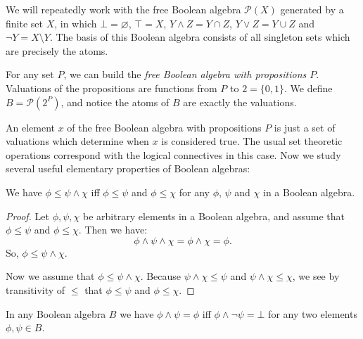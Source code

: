 We will repeatedly work with the free Boolean algebra $\mathcal{P}(X)$ generated by a finite set $X$, in which $\bot = \varnothing$, $\top = X$, $Y \land Z = Y \cap Z$, $Y \lor Z = Y \cup Z$ and $\neg Y = X \setminus Y$. The basis of this Boolean algebra consists of all singleton sets which are precisely the atoms.

\begin{example}
For any set $P$, we can build the \emph{free Boolean algebra with propositions $P$}. Valuations of the propositions are functions from $P$ to $2 = \{0 ,1\}$. We define $B = \mathcal{P}(2^P)$, and notice the atoms of $B$ are exactly the valuations.
\end{example}

An element $x$ of the free Boolean algebra with propositions $P$ is just a set of valuations which determine when $x$ is considered true. The usual set theoretic operations correspond with the logical connectives in this case. Now we study several useful elementary properties of Boolean algebras:

\begin{lem}
\label{and}
We have $\phi \leq \psi \wedge \chi$ iff $\phi \leq \psi$ and $\phi \leq \chi$ for any $\phi$, $\psi$ and $\chi$ in a Boolean algebra.
\end{lem}

\begin{proof}
Let $\phi, \psi, \chi$ be arbitrary elements in a Boolean algebra, and assume that $\phi \leq \psi$ and $\phi \leq \chi$. Then we have:
\[\phi \land \psi \land \chi = \phi \land \chi = \phi.\]
So, $\phi \leq \psi \land \chi$.

Now we assume that $\phi \leq \psi \land \chi$. Because $\psi \land \chi \leq \psi$ and $\psi \land \chi \leq \chi$, we see by transitivity of $\le$ that $\phi \leq \psi$ and $\phi \leq \chi$.
\end{proof}

\begin{lem}
\label{phi-psi}
In any Boolean algebra $B$ we have $\phi \land \psi = \phi$ iff $\phi \land \neg \psi = \bot$ for any two elements $\phi,\psi\in B$.
\end{lem}

